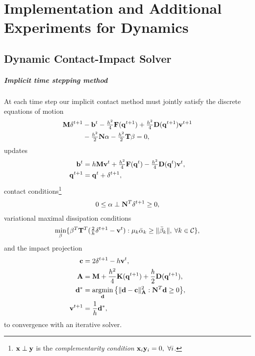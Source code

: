 \chapter{Implementation and Additional Experiments for Dynamics}
\section{Dynamic Contact-Impact Solver}
\label{sec:iter_dyn_solver}
\paragraph{Implicit time stepping method} 
At each time step our implicit contact method must jointly satisfy the discrete equations of motion
%
\begin{align}
\begin{split}
\mathbf {M} \mathbf {\delta}^{t+1} & - \mathbf {b}^t - \tfrac{h^2}{4} \mathbf {F}(\mathbf {q}^{t+1}) + \tfrac{h^2}{4} \mathbf {D}(\mathbf {q}^{t+1}) \mathbf {v}^{t+1} \\
&- \tfrac{h^2}{2} \mathbf {N} \alpha -  \tfrac{h^2}{2}  \mathbf {T} \beta = 0, 
\label{eq:ap_newmark_contact_implicit}
\end{split}
\end{align}
updates
\begin{align}
\begin{split}
\mathbf {b}^t &= h \mathbf {M} \mathbf {v}^t + \tfrac{h^2}{4} \mathbf {F}( \mathbf {q}^t) -\tfrac{h^2}{4} \mathbf {D}( \mathbf {q}^t) \mathbf {v}^t, \\
\mathbf {q}^{t+1} &= \mathbf {q}^t + \mathbf {\delta}^{t+1},
\end{split}
\end{align}
%
contact conditions\footnote{$\mathbf {x} \perp \mathbf {y}$ is the \emph{complementarity condition} $\mathbf {x}_i \mathbf {y}_i = 0,\ \forall i$.} 
%
\begin{align}
0 \leq \alpha \perp \mathbf {N}^T \delta^{t+1} \geq 0, 
\label{eq:ap_contact_conditions}
\end{align}
%
variational maximal dissipation conditions
%
\begin{align}
\begin{split}
\min_{\beta} \{ \beta^T \mathbf {T}^T (\tfrac{2}{h} \delta^{t+1} - \mathbf {v}^t) : \mu_k \bar{\alpha}_k \geq \|\bar{\beta}_k\|, \> \forall k \in \mathcal{C} \}, 
\label{eq:ap_max_diss_transform}
\end{split}
\end{align} 
%
and the impact projection
%
\begin{align}
\begin{split}
\mathbf {c} &= 2 \mathbf {\delta}^{t+1} - h \mathbf {v}^t, \\
\mathbf {A} &= \mathbf {M} + \frac{h^2}{4} \mathbf {K}(\mathbf {q}^{t+1}) + \frac{h}{2} \mathbf {D}(\mathbf {q}^{t+1}) ,\\
\mathbf {d}^* &= \mathop{\rm argmin}_{\mathbf {d}} \big\{ \| \mathbf {d} - \mathbf {c} \|^2_{\mathbf {A}} : \mathbf {N}^T \mathbf {d} \geq 0 \big\},\\
\mathbf {v}^{t+1} &= \frac{1}{h} \mathbf {d}^*,\\
\end{split}
\label{eq:ap_newmark_predictor_proj}
\end{align}
to convergence with an iterative solver.

